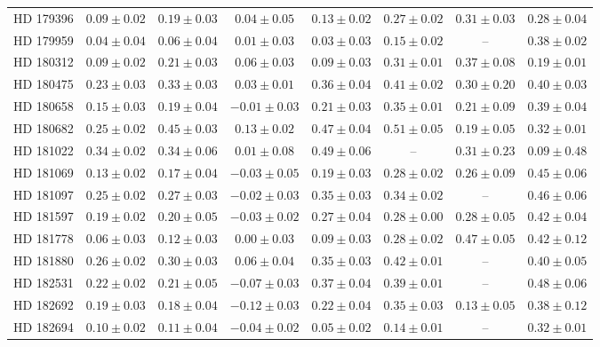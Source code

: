 \begin{table*}
\begin{tabular}{cccccccc}
HD 179396 & $0.09 \pm 0.02$ & $0.19 \pm 0.03$ & $0.04 \pm 0.05$ & $0.13 \pm 0.02$ & $0.27 \pm 0.02$ & $0.31 \pm 0.03$ & $0.28 \pm 0.04$ \\
HD 179959 & $0.04 \pm 0.04$ & $0.06 \pm 0.04$ & $0.01 \pm 0.03$ & $0.03 \pm 0.03$ & $0.15 \pm 0.02$ & -- & $0.38 \pm 0.02$ \\
HD 180312 & $0.09 \pm 0.02$ & $0.21 \pm 0.03$ & $0.06 \pm 0.03$ & $0.09 \pm 0.03$ & $0.31 \pm 0.01$ & $0.37 \pm 0.08$ & $0.19 \pm 0.01$ \\
HD 180475 & $0.23 \pm 0.03$ & $0.33 \pm 0.03$ & $0.03 \pm 0.01$ & $0.36 \pm 0.04$ & $0.41 \pm 0.02$ & $0.30 \pm 0.20$ & $0.40 \pm 0.03$ \\
HD 180658 & $0.15 \pm 0.03$ & $0.19 \pm 0.04$ & $-0.01 \pm 0.03$ & $0.21 \pm 0.03$ & $0.35 \pm 0.01$ & $0.21 \pm 0.09$ & $0.39 \pm 0.04$ \\
HD 180682 & $0.25 \pm 0.02$ & $0.45 \pm 0.03$ & $0.13 \pm 0.02$ & $0.47 \pm 0.04$ & $0.51 \pm 0.05$ & $0.19 \pm 0.05$ & $0.32 \pm 0.01$ \\
HD 181022 & $0.34 \pm 0.02$ & $0.34 \pm 0.06$ & $0.01 \pm 0.08$ & $0.49 \pm 0.06$ & -- & $0.31 \pm 0.23$ & $0.09 \pm 0.48$ \\
HD 181069 & $0.13 \pm 0.02$ & $0.17 \pm 0.04$ & $-0.03 \pm 0.05$ & $0.19 \pm 0.03$ & $0.28 \pm 0.02$ & $0.26 \pm 0.09$ & $0.45 \pm 0.06$ \\
HD 181097 & $0.25 \pm 0.02$ & $0.27 \pm 0.03$ & $-0.02 \pm 0.03$ & $0.35 \pm 0.03$ & $0.34 \pm 0.02$ & -- & $0.46 \pm 0.06$ \\
HD 181597 & $0.19 \pm 0.02$ & $0.20 \pm 0.05$ & $-0.03 \pm 0.02$ & $0.27 \pm 0.04$ & $0.28 \pm 0.00$ & $0.28 \pm 0.05$ & $0.42 \pm 0.04$ \\
HD 181778 & $0.06 \pm 0.03$ & $0.12 \pm 0.03$ & $0.00 \pm 0.03$ & $0.09 \pm 0.03$ & $0.28 \pm 0.02$ & $0.47 \pm 0.05$ & $0.42 \pm 0.12$ \\
HD 181880 & $0.26 \pm 0.02$ & $0.30 \pm 0.03$ & $0.06 \pm 0.04$ & $0.35 \pm 0.03$ & $0.42 \pm 0.01$ & -- & $0.40 \pm 0.05$ \\
HD 182531 & $0.22 \pm 0.02$ & $0.21 \pm 0.05$ & $-0.07 \pm 0.03$ & $0.37 \pm 0.04$ & $0.39 \pm 0.01$ & -- & $0.48 \pm 0.06$ \\
HD 182692 & $0.19 \pm 0.03$ & $0.18 \pm 0.04$ & $-0.12 \pm 0.03$ & $0.22 \pm 0.04$ & $0.35 \pm 0.03$ & $0.13 \pm 0.05$ & $0.38 \pm 0.12$ \\
HD 182694 & $0.10 \pm 0.02$ & $0.11 \pm 0.04$ & $-0.04 \pm 0.02$ & $0.05 \pm 0.02$ & $0.14 \pm 0.01$ & -- & $0.32 \pm 0.01$ \\

\end{tabular}
\end{table*}
